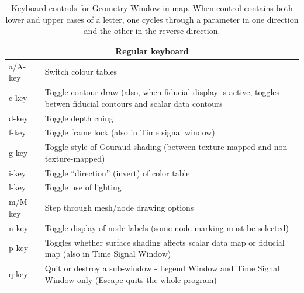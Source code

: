 \begin{table}[htbp]
        \caption{\label{table:keys} Keyboard controls for Geometry Window
          in map{}.  When control contains both lower and upper cases of a
          letter, one cycles through a parameter in one direction and the
          other in the reverse direction.}
    \begin{center}
        \begin{tabular}{|l|p{6in}|} \hline
        \multicolumn{2}{|c|}{\textbf{Regular keyboard}} \\ \hline
        a/A-key   &       Switch colour tables \\ \hline
        c-key   &       Toggle contour draw  (also, when fiducial display
	is active, toggles betwen fiducial contours and scalar data contours \\ \hline
        d-key   &       Toggle depth cuing\\ \hline
        f-key   &       Toggle frame lock (also in Time signal window)\\ \hline
       g-key   &       Toggle style of Gouraud shading (between
       texture-mapped and non-texture-mapped) \\ \hline 
        i-key   &       Toggle ``direction'' (invert) of color table\\ \hline
        l-key   &       Toggle use of lighting\\ \hline
        m/M-key   &       Step through mesh/node drawing options \\ \hline
        n-key   &       Toggle display of node labels (some node marking
        must be selected)\\ \hline 
        p-key   &       Toggles whether surface shading affects scalar data map or
	fiducial map
         (also in Time Signal Window)\\ \hline 
         q-key   &       Quit or destroy a sub-window - Legend Window and
         Time Signal Window only (Escape quits the 
                         whole program) \\ \hline

\end{tabular}
\end{center}
\end{table}
